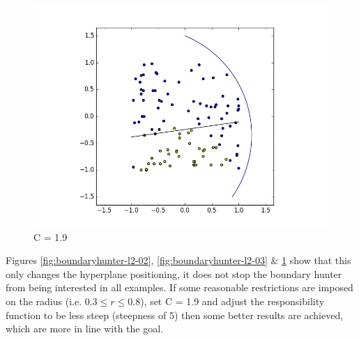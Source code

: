 \documentclass[notitlepage]{report}
\theoremstyle{definition}
\begin{document}
\begin{figure}[H]
\begin{minipage}[b]{0.49\textwidth}
    \caption{C = 1.6}
    \label{fig:boundaryhunter-l2-03}
  \end{minipage}
  \hfill
  \begin{minipage}[b]{0.49\textwidth}
    \includegraphics[width=\textwidth]{BoundaryHunter-Attempt3-04.png}
    \caption{C = 1.9}
    \label{fig:boundaryhunter-l2-04}
  \end{minipage}
\end{figure}

Figures \ref{fig:boundaryhunter-l2-02}, \ref{fig:boundaryhunter-l2-03} \& \ref{fig:boundaryhunter-l2-04} show that this only changes the hyperplane positioning, it does not stop the boundary hunter from being interested in all examples. If some reasonable restrictions are imposed on the radius (i.e. $0.3 \leq r \leq 0.8$), set C = 1.9 and adjust the responsibility function to be less steep (steepness of 5) then some better results are achieved, which are more in line with the goal.
\end{document}

